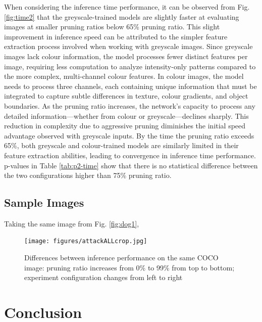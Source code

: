 \documentclass[journal,onecolumn,12pt]{IEEEtran}
\begin{document}
When considering the inference time performance, it can be observed from Fig. \ref{fig:time2} that the greyscale-trained models are slightly faster at evaluating images at smaller pruning ratios below 65\% pruning ratio. This slight improvement in inference speed can be attributed to the simpler feature extraction process involved when working with greyscale images. Since greyscale images lack colour information, the model processes fewer distinct features per image, requiring less computation to analyze intensity-only patterns compared to the more complex, multi-channel colour features. In colour images, the model needs to process three channels, each containing unique information that must be integrated to capture subtle differences in texture, colour gradients, and object boundaries. As the pruning ratio increases, the network's capacity to process any detailed information—whether from colour or greyscale—declines sharply. This reduction in complexity due to aggressive pruning diminishes the initial speed advantage observed with greyscale inputs. By the time the pruning ratio exceeds 65\%, both greyscale and colour-trained models are similarly limited in their feature extraction abilities, leading to convergence in inference time performance. p-values in Table \ref{tab:p2-time} show that there is no statistical difference between the two configurations higher than 75\% pruning ratio.

\subsection{Sample Images}

Taking the same image from Fig. \ref{fig:dog1}, 

\begin{figure}
    \centering
    \captionsetup{justification=centering}
    \texttt{[image: figures/attackALLcrop.jpg]}
    \caption*{}
    \caption{Differences between inference performance on the same COCO image: pruning ratio increases from 0\% to 99\% from top to bottom; experiment configuration changes from left to right}
    \label{fig:attackAll}
\end{figure}

\section{Conclusion}
\end{document}
